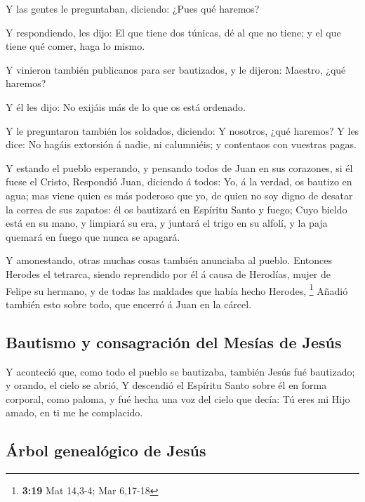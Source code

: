  Y las gentes le preguntaban, diciendo: ¿Pues qué haremos?

 Y respondiendo, les dijo: El que tiene dos túnicas, dé al
que no tiene; y el que tiene qué comer, haga lo mismo.

 Y vinieron también publicanos para ser bautizados, y le
dijeron: Maestro, ¿qué haremos?

 Y él les dijo: No exijáis más de lo que os está ordenado.

 Y le preguntaron también los soldados, diciendo: Y
nosotros, ¿qué haremos? Y les dice: No hagáis extorsión á nadie, ni
calumniéis; y contentaos con vuestras pagas.

 Y estando el pueblo esperando, y pensando todos de Juan en
sus corazones, si él fuese el Cristo,  Respondió Juan,
diciendo á todos: Yo, á la verdad, os bautizo en agua; mas viene quien
es más poderoso que yo, de quien no soy digno de desatar la correa de
sus zapatos: él os bautizará en Espíritu Santo y fuego; 
Cuyo bieldo está en su mano, y limpiará su era, y juntará el trigo en su
alfolí, y la paja quemará en fuego que nunca se apagará.

 Y amonestando, otras muchas cosas también anunciaba al
pueblo.  Entonces Herodes el tetrarca, siendo reprendido
por él á causa de Herodías, mujer de Felipe su hermano, y de todas las
maldades que había hecho Herodes, \footnote{\textbf{3:19} Mat 14,3-4;
  Mar 6,17-18}  Añadió también esto sobre todo, que encerró
á Juan en la cárcel.

\hypertarget{bautismo-y-consagraciuxf3n-del-mesuxedas-de-jesuxfas}{%
\subsection{Bautismo y consagración del Mesías de
Jesús}\label{bautismo-y-consagraciuxf3n-del-mesuxedas-de-jesuxfas}}

 Y aconteció que, como todo el pueblo se bautizaba, también
Jesús fué bautizado; y orando, el cielo se abrió,  Y
descendió el Espíritu Santo sobre él en forma corporal, como paloma, y
fué hecha una voz del cielo que decía: Tú eres mi Hijo amado, en ti me
he complacido.

\hypertarget{uxe1rbol-genealuxf3gico-de-jesuxfas}{%
\subsection{Árbol genealógico de
Jesús}\label{uxe1rbol-genealuxf3gico-de-jesuxfas}}


